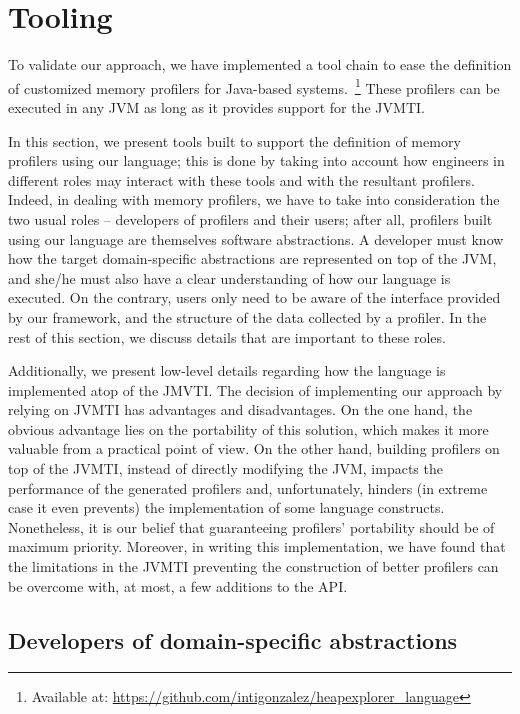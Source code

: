 \section{Tooling}\label{sec:dsl-implementation}

To validate our approach, we have implemented a tool chain to ease the definition of customized memory profilers for Java-based systems.~\footnote{Available at: \url{https://github.com/intigonzalez/heapexplorer\_language}}
These profilers can be executed in any JVM as long as it provides support for the JVMTI.

In this section, we present tools built to support the definition of memory profilers using our language; this is done by taking into account how engineers in different roles may interact with these tools and with the resultant profilers.
Indeed, in dealing with memory profilers, we have to take into consideration the two usual roles -- developers of profilers and their users; after all, profilers built using our language are themselves software abstractions.
A developer must know how the target domain-specific abstractions are represented on top of the JVM, and she/he must also have a clear understanding of how our language is executed.
On the contrary, users only need to be aware of the interface provided by our framework, and the structure of the data collected by a profiler.
In the rest of this section, we discuss details that are important to these roles.

Additionally, we present low-level details regarding how the language is implemented atop of the JMVTI.
The decision of implementing our approach by relying on JVMTI has advantages and disadvantages.
On the one hand, the obvious advantage lies on the portability of this solution, which makes it more valuable from a practical point of view.
On the other hand, building profilers on top of the JVMTI, instead of directly modifying the JVM, impacts the performance of the generated profilers and, unfortunately, hinders (in extreme case it even prevents) the implementation of some language constructs.
Nonetheless, it is our belief that guaranteeing profilers' portability should be of maximum priority.
Moreover, in writing this implementation, we have found that the limitations in the JVMTI preventing the construction of better profilers can be overcome with, at most, a few additions to the API.


\subsection{Developers of domain-specific abstractions}

